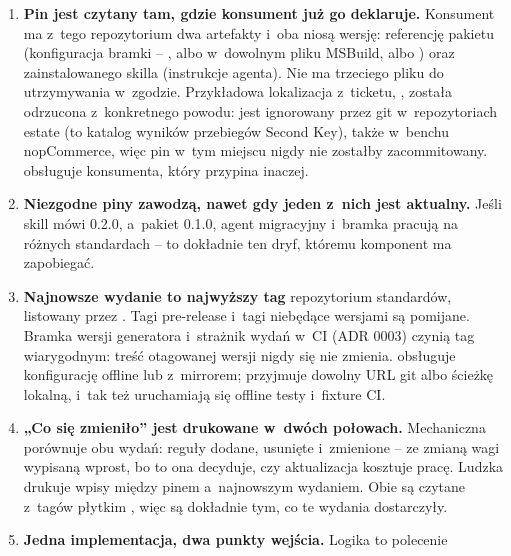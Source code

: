 \begin{enumerate}
  \item \textbf{Pin jest czytany tam, gdzie konsument już go deklaruje.} Konsument ma z~tego
        repozytorium dwa artefakty i~oba niosą wersję: referencję pakietu
         (konfiguracja bramki -- ,
         albo  w~dowolnym pliku
        MSBuild, albo ) oraz 
        zainstalowanego skilla (instrukcje agenta). Nie ma trzeciego pliku do utrzymywania
        w~zgodzie. Przykładowa lokalizacja z~ticketu, , została
        odrzucona z~konkretnego powodu:  jest ignorowany przez git
        w~repozytoriach estate (to katalog wyników przebiegów Second Key), także w~benchu
        nopCommerce, więc pin w~tym miejscu nigdy nie zostałby zacommitowany.
         obsługuje konsumenta, który przypina inaczej.
  \item \textbf{Niezgodne piny zawodzą, nawet gdy jeden z~nich jest aktualny.} Jeśli skill
        mówi 0.2.0, a~pakiet 0.1.0, agent migracyjny i~bramka pracują na różnych
        standardach -- to dokładnie ten dryf, któremu komponent ma zapobiegać.
  \item \textbf{Najnowsze wydanie to najwyższy tag }
        repozytorium standardów, listowany przez . Tagi pre-release
        i~tagi niebędące wersjami są pomijane. Bramka wersji generatora i~strażnik wydań w~CI
        (ADR 0003) czynią tag wiarygodnym: treść otagowanej wersji nigdy się nie zmienia.
         obsługuje konfigurację offline lub z~mirrorem;
         przyjmuje dowolny URL git albo ścieżkę lokalną, i~tak też
        uruchamiają się offline testy i~fixture CI.
  \item \textbf{„Co się zmieniło” jest drukowane w~dwóch połowach.} Mechaniczna porównuje
         obu wydań: reguły dodane, usunięte i~zmienione -- ze
        zmianą wagi wypisaną wprost, bo to ona decyduje, czy aktualizacja kosztuje pracę.
        Ludzka drukuje wpisy  między pinem a~najnowszym wydaniem. Obie są
        czytane z~tagów płytkim , więc są dokładnie tym, co te wydania
        dostarczyły.
  \item \textbf{Jedna implementacja, dwa punkty wejścia.} Logika to polecenie

\end{enumerate}
